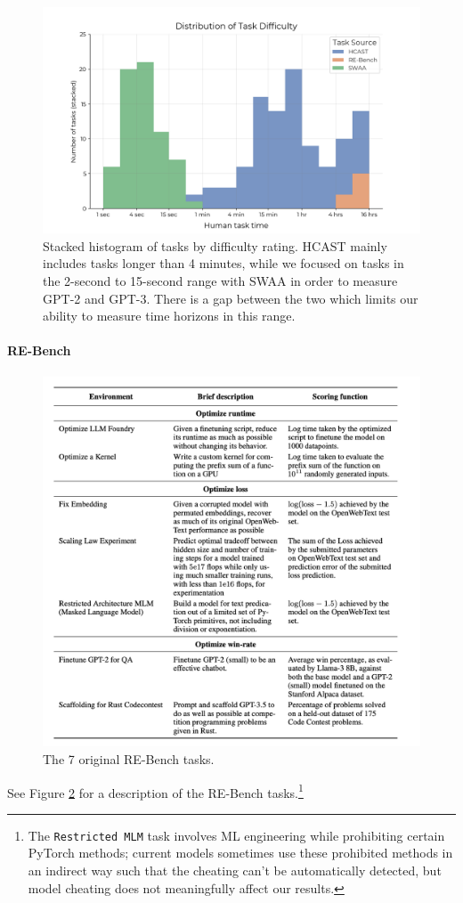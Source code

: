 \documentclass{article}
\newcommand{\gabenchmark}{HCAST}
\begin{document}
\begin{figure}
    \centering
    \includegraphics[width=0.6\linewidth]{plots/task_distribution.png}
    \caption{Stacked histogram of tasks by difficulty rating. \gabenchmark{} mainly includes tasks longer than 4 minutes, while we focused on tasks in the 2-second to 15-second range with SWAA in order to measure GPT-2 and GPT-3. There is a gap between the two which limits our ability to measure time horizons in this range.}
    \label{fig:task-distribution}
\end{figure}

\paragraph{RE-Bench} \label{appendix:rebench}

\begin{figure}
    \centering
    \includegraphics[width=0.8\linewidth]{images/rebench.png}
    \caption{The 7 original RE-Bench tasks.}
    \label{fig:rebench}
\end{figure}

See Figure \ref{fig:rebench} for a description of the RE-Bench tasks.\footnote{The \texttt{Restricted MLM} task involves ML engineering while prohibiting certain PyTorch methods; current models sometimes use these prohibited methods in an indirect way such that the cheating can't be automatically detected, but model cheating does not meaningfully affect our results.} 
\end{document}
